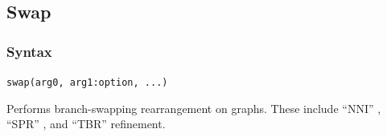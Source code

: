 \subsection{Swap} 
	\subsubsection{Syntax}
		\texttt{swap(arg0, arg1:option, ...)}
			
	\begin{phygdescription}
		{Performs branch-swapping rearrangement on graphs. These include ``NNI'' \citep{CaminandSokal1965, 
		Robinson1971}, ``SPR'' \citep{Dayhoff1969}, and ``TBR'' \citep{Farris1988, swofford1990a} refinement.}
	\end{phygdescription}
		
